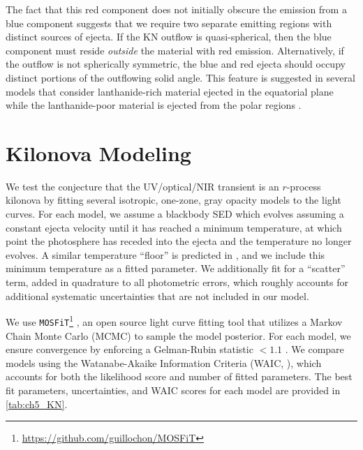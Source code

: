 The fact that this red component does not initially obscure the emission from a blue component suggests that we require two separate emitting regions with distinct sources of ejecta. If the KN outflow is quasi-spherical, then the blue component must reside {\it outside} the material with red emission.  Alternatively, if the outflow is not spherically symmetric, the blue and red ejecta should occupy distinct portions of the outflowing solid angle. This feature is suggested in several models that consider lanthanide-rich material ejected in the equatorial plane while the lanthanide-poor material is ejected from the polar regions \citep{Kasen+15,Metzger2017}.

\section{Kilonova Modeling}
\label{sec:ch5_models}

We test the conjecture that the UV/optical/NIR transient is an $r$-process kilonova by fitting several isotropic, one-zone, gray opacity models to the light curves. For each model, we assume a blackbody SED which evolves assuming a constant ejecta velocity until it has reached a minimum temperature, at which point the photosphere has receded into the ejecta and the temperature no longer evolves. A similar temperature ``floor'' is predicted in \cite{BarnesKasen13}, and we include this minimum temperature as a fitted parameter.  We additionally fit for a ``scatter'' term, added in quadrature to all photometric errors, which roughly accounts for additional systematic uncertainties that are not included in our model.

We use {\tt MOSFiT}\footnote{\url{https://github.com/guillochon/MOSFiT}} \citep{Guillochon+17b,Nicholl+17b}, an open source light curve fitting tool that utilizes a Markov Chain Monte Carlo (MCMC) to sample the model posterior. For each model, we ensure convergence by enforcing a Gelman-Rubin statistic $<1.1$ \citep{GelmanRubin92}.  We compare models using the Watanabe-Akaike Information Criteria (WAIC, \citealt{Watanabe2010,Gelman+14}), which accounts for both the likelihood score and number of fitted parameters. The best fit parameters, uncertainties, and WAIC scores for each model are provided in \cref{tab:ch5_KN}.

